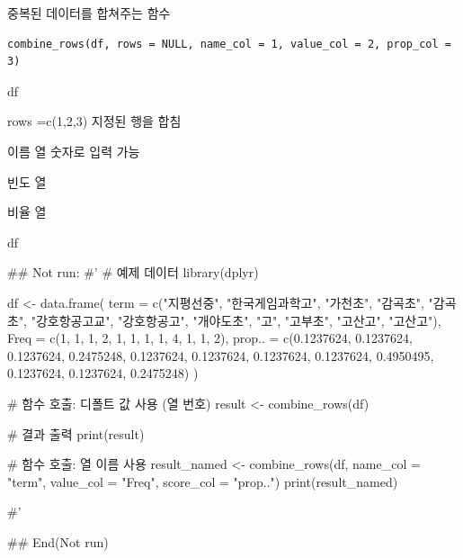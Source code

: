 \documentclass[a4paper]{book}
\begin{document}
%
\begin{Description}
중복된 데이터를 합쳐주는 함수
\end{Description}
%
\begin{Usage}
\begin{verbatim}
combine_rows(df, rows = NULL, name_col = 1, value_col = 2, prop_col = 3)
\end{verbatim}
\end{Usage}
%
\begin{Arguments}
\begin{ldescription}
\item[\code{df}] df

\item[\code{rows}] rows =c(1,2,3) 지정된 행을 합침

\item[\code{name\_col}] 이름 열 숫자로 입력 가능

\item[\code{value\_col}] 빈도 열

\item[\code{prop\_col}] 비율 열
\end{ldescription}
\end{Arguments}
%
\begin{Value}
df
\end{Value}
%
\begin{Examples}
\begin{ExampleCode}
## Not run: 
#'
# 예제 데이터
library(dplyr)

df <- data.frame(
  term = c("지평선중", "한국게임과학고", "가천초", "감곡초", "감곡초",
           "강호항공고교", "강호항공고", "개야도초", "고", "고부초",
           "고산고", "고산고"),
  Freq = c(1, 1, 1, 2, 1, 1, 1, 1, 4, 1, 1, 2),
  prop.. = c(0.1237624, 0.1237624, 0.1237624, 0.2475248, 0.1237624,
             0.1237624, 0.1237624, 0.1237624, 0.4950495, 0.1237624,
             0.1237624, 0.2475248)
)

# 함수 호출: 디폴트 값 사용 (열 번호)
result <- combine_rows(df)

# 결과 출력
print(result)

# 함수 호출: 열 이름 사용
result_named <- combine_rows(df, name_col = "term", value_col = "Freq", score_col = "prop..")
print(result_named)

#'

## End(Not run)
\end{ExampleCode}
\end{Examples}
\end{document}
